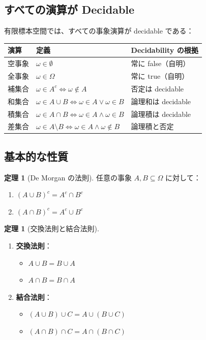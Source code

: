 \documentclass[12pt,a4paper,ja=standard]{bxjsarticle}
\theoremstyle{definition}
\newtheorem{theorem}[definition]{定理}
\begin{document}
\subsection{すべての演算が Decidable}

\begin{keypoint}
有限標本空間では、すべての事象演算が decidable である：

\begin{center}
\begin{tabular}{|l|l|l|}
\hline
\textbf{演算} & \textbf{定義} & \textbf{Decidability の根拠} \\
\hline
空事象 & $\omega \in \emptyset$ & 常に false（自明） \\
全事象 & $\omega \in \Omega$ & 常に true（自明） \\
補集合 & $\omega \in A^c \iff \omega \notin A$ & 否定は decidable \\
和集合 & $\omega \in A \cup B \iff \omega \in A \lor \omega \in B$ & 論理和は decidable \\
積集合 & $\omega \in A \cap B \iff \omega \in A \land \omega \in B$ & 論理積は decidable \\
差集合 & $\omega \in A \setminus B \iff \omega \in A \land \omega \notin B$ & 論理積と否定 \\
\hline
\end{tabular}
\end{center}
\end{keypoint}

\subsection{基本的な性質}

\begin{theorem}[De Morgan の法則]
任意の事象 $A, B \subseteq \Omega$ に対して：
\begin{enumerate}
    \item $(A \cup B)^c = A^c \cap B^c$
    \item $(A \cap B)^c = A^c \cup B^c$
\end{enumerate}
\end{theorem}

\begin{theorem}[交換法則と結合法則]
\begin{enumerate}
    \item \textbf{交換法則}：
    \begin{itemize}
        \item $A \cup B = B \cup A$
        \item $A \cap B = B \cap A$
    \end{itemize}
    \item \textbf{結合法則}：
    \begin{itemize}
        \item $(A \cup B) \cup C = A \cup (B \cup C)$
        \item $(A \cap B) \cap C = A \cap (B \cap C)$
    \end{itemize}
\end{enumerate}
\end{theorem}
\end{document}
